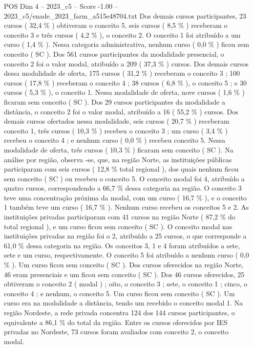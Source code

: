 \begin{textsample}{POS Dim 4 – 2023\_c5 – Score -1.00 – 2023\_c5/enade\_2023\_farm\_a515e48704.txt}
Dos demais cursos participantes, 23 cursos ( 32,4 \% ) obtiveram o conceito 5, seis cursos ( 8,5 \% ) receberam o conceito 3 e três cursos ( 4,2 \% ), o conceito 2.
O conceito 1 foi atribuído a um curso ( 1,4 \% ).
Nessa categoria administrativa, nenhum curso ( 0,0 \% ) ficou sem conceito ( SC ).
Dos 561 cursos participantes da modalidade presencial, o conceito 2 foi o valor modal, atribuído a 209 ( 37,3 \% ) cursos.
Dos demais cursos dessa modalidade de oferta, 175 cursos ( 31,2 \% ) receberam o conceito 3 ; 100 cursos ( 17,8 \% ) receberam o conceito 4 ; 38 cursos ( 6,8 \% ), o conceito 5 ; e 30 cursos ( 5,3 \% ), o conceito 1.
Nessa modalidade de oferta, nove cursos ( 1,6 \% ) ficaram sem conceito ( SC ).
Dos 29 cursos participantes da modalidade a distância, o conceito 2 foi o valor modal, atribuído a 16 ( 55,2 \% ) cursos.
Dos demais cursos ofertados nessa modalidade, seis cursos ( 20,7 \% ) receberam conceito 1, três cursos ( 10,3 \% ) recebeu o conceito 3 ; um curso ( 3,4 \% ) recebeu o conceito 4 ; e nenhum curso ( 0,0 \% ) recebeu conceito 5.
Nessa modalidade de oferta, três cursos ( 10,3 \% ) ficaram sem conceito ( SC ).
Na análise por região, observa -se, que, na região Norte, as instituições públicas participaram com seis cursos ( 12,8 \% total regional ), dos quais nenhum ficou sem conceito ( SC ) ou recebeu o conceito 5.
O conceito modal foi 4, atribuído a quatro cursos, correspondendo a 66,7 \% dessa categoria na região.
O conceito 3 teve uma concentração próxima da modal, com um curso ( 16,7 \% ), e o conceito 1 também teve um curso ( 16,7 \% ).
Nenhum curso recebeu os conceitos 5 e 2.
As instituições privadas participaram com 41 cursos na região Norte ( 87,2 \% do total regional ), e um curso ficou sem conceito ( SC ).
O conceito modal nas instituições privadas na região foi o 2, atribuído a 25 cursos, o que corresponde a 61,0 \% dessa categoria na região.
Os conceitos 3, 1 e 4 foram atribuídos a sete, sete e um curso, respectivamente.
O conceito 5 foi atribuído a nenhum curso ( 0,0 \% ).
Um curso ficou sem conceito ( SC ).
Dos cursos oferecidos na região Norte, 46 eram presenciais e um ficou sem conceito ( SC ).
Dos 46 cursos oferecidos, 25 obtiveram o conceito 2 ( modal ) ; oito, o conceito 3 ; sete, o conceito 1 ; cinco, o conceito 4 ; e nenhum, o conceito 5.
Um curso ficou sem conceito ( SC ).
Um curso era na modalidade a distância, tendo um recebido o conceito modal 1.
Na região Nordeste, a rede privada concentra 124 dos 144 cursos participantes, o equivalente a 86,1 \% do total da região.
Entre os cursos oferecidos por IES privadas no Nordeste, 73 cursos foram avaliados com conceito 2, o conceito modal.

\end{textsample}
